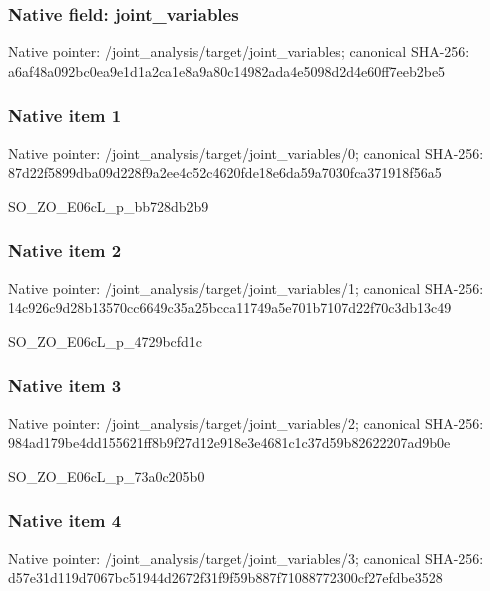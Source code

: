 \documentclass[10pt,a4paper]{article}
\begin{document}
\subsubsection{Native field: joint\_variables}


Native pointer: /joint\_analysis/target/joint\_variables; canonical SHA-256: a6af48a092bc0ea9e1d1a2ca\allowbreak{}1e8a9a80c14982ada4e5098d\allowbreak{}2d4e60ff7eeb2be5



\subsubsection{Native item 1}


Native pointer: /joint\_analysis/target/j\allowbreak{}oint\_variables/0; canonical SHA-256: 87d22f5899dba09d228f9a2e\allowbreak{}e4c52c4620fde18e6da59a70\allowbreak{}30fca371918f56a5


SO\_ZO\_E06cL\_p\_bb728db2b9


\subsubsection{Native item 2}


Native pointer: /joint\_analysis/target/j\allowbreak{}oint\_variables/1; canonical SHA-256: 14c926c9d28b13570cc6649c\allowbreak{}35a25bcca11749a5e701b710\allowbreak{}7d22f70c3db13c49


SO\_ZO\_E06cL\_p\_4729bcfd1c


\subsubsection{Native item 3}


Native pointer: /joint\_analysis/target/j\allowbreak{}oint\_variables/2; canonical SHA-256: 984ad179be4dd155621ff8b9\allowbreak{}f27d12e918e3e4681c1c37d5\allowbreak{}9b82622207ad9b0e


SO\_ZO\_E06cL\_p\_73a0c205b0


\subsubsection{Native item 4}


Native pointer: /joint\_analysis/target/j\allowbreak{}oint\_variables/3; canonical SHA-256: d57e31d119d7067bc51944d2\allowbreak{}672f31f9f59b887f71088772\allowbreak{}300cf27efdbe3528
\end{document}
